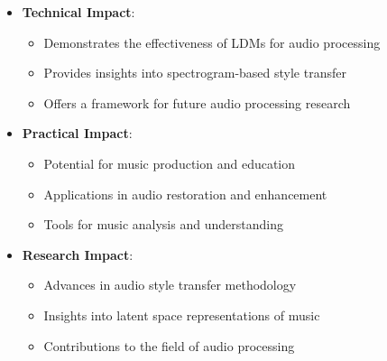 \begin{itemize}
    \item \textbf{Technical Impact}:
    \begin{itemize}
        \item Demonstrates the effectiveness of LDMs for audio processing
        \item Provides insights into spectrogram-based style transfer
        \item Offers a framework for future audio processing research
    \end{itemize}
    
    \item \textbf{Practical Impact}:
    \begin{itemize}
        \item Potential for music production and education
        \item Applications in audio restoration and enhancement
        \item Tools for music analysis and understanding
    \end{itemize}
    
    \item \textbf{Research Impact}:
    \begin{itemize}
        \item Advances in audio style transfer methodology
        \item Insights into latent space representations of music
        \item Contributions to the field of audio processing
    \end{itemize}
\end{itemize} 